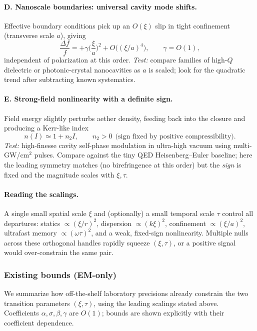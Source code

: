 \paragraph{D. Nanoscale boundaries: universal cavity mode shifts.}
Effective boundary conditions pick up an $O(\xi)$ slip in tight confinement (transverse scale $a$), giving
\begin{equation}
\frac{\Delta f}{f}=+\gamma\Big(\frac{\xi}{a}\Big)^2 + O\big((\xi/a)^4\big),\qquad \gamma=O(1),
\end{equation}
independent of polarization at this order.
\emph{Test:} compare families of high-$Q$ dielectric or photonic-crystal nanocavities as $a$ is scaled; look for the quadratic trend after subtracting known systematics.

\paragraph{E. Strong-field nonlinearity with a definite sign.}
Field energy slightly perturbs aether density, feeding back into the closure and producing a Kerr-like index
\begin{equation}
n(I)\simeq 1+n_2 I,\qquad n_2>0 \ \ \text{(sign fixed by positive compressibility)}.
\end{equation}
\emph{Test:} high-finesse cavity self-phase modulation in ultra-high vacuum using multi-GW/cm$^2$ pulses. Compare against the tiny QED Heisenberg–Euler baseline; here the leading symmetry matches (no birefringence at this order) but the \emph{sign} is fixed and the magnitude scales with $\xi,\tau$.

\paragraph{Reading the scalings.}
A single small spatial scale $\xi$ and (optionally) a small temporal scale $\tau$ control all departures: statics $\propto(\xi/r)^2$, dispersion $\propto(k\xi)^2$, confinement $\propto(\xi/a)^2$, ultrafast memory $\propto(\omega\tau)^2$, and a weak, fixed-sign nonlinearity. Multiple nulls across these orthogonal handles rapidly squeeze $(\xi,\tau)$, or a positive signal would over-constrain the same pair.

\subsubsection{Existing bounds (EM-only)}
\label{subsec:EM_existing_bounds}
We summarize how off-the-shelf laboratory precisions already constrain the two transition parameters $(\xi,\tau)$, using the leading scalings stated above. Coefficients $\alpha,\sigma,\beta,\gamma$ are $O(1)$; bounds are shown explicitly with their coefficient dependence.

